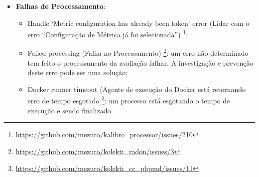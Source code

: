 \begin{itemize}
\begin{itemize}
      \item Multiple calls to process trigger multiple redundant periodic
      processings (Chamadas excessivas para o gatilho de processo com muitos
      períodos de processamento redundante)
      \footnote{\url{https://github.com/mezuro/kalibro\_processor/issues/208}}:
        muitas chamadas para os métodos de processamento estão sendo feitas, o
        que gera muitos processos e muito desperdício de tempo.

        Uma solução é a separação de diferentes filas de requisições para
        diferentes eventos.

      \item Separate processings in multiple queues (Processos separados por
      várias filas)
      \footnote{\url{https://github.com/mezuro/kalibro\_processor/issues/209}}:
        A sugestão é a separação de três filas de requisição de processamento,
        com prioridades distintas. Maior para novos repositórios avaliados,
        baixa prioridade para os reprocessamentos e o isolamento dos
        processamentos periódicos

    \end{itemize}
  \item \textbf{Falhas de Processamento}:
    \begin{itemize}
      \item Handle `Metric configuration has already been taken` error (Lidar
      com o erro ``Configuração de Métrica já foi selecionada'')
      \footnote{\url{https://github.com/mezuro/kalibro\_processor/issues/210}};

      \item Failed processing (Falha no Processamento)
      \footnote{\url{https://github.com/mezuro/kolekti\_radon/issues/3}}:
        um erro não determinado tem feito o processamento da avaliação falhar.
        A investigação e prevenção deste erro pode ser uma solução;

      \item Docker runner timeout (Agente de execução do Docker está retornando
      erro de tempo esgotado
      \footnote{\url{https://github.com/mezuro/kolekti\_cc\_phpmd/issues/11}}:
        um processo está esgotando o tempo de execução e sendo finalizado.
    \end{itemize}
\end{itemize}
